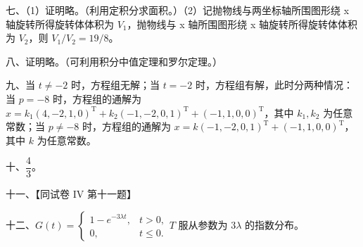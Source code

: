 \documentclass[UTF8,12pt]{ctexart}
\begin{document}
七、（1）证明略。（利用定积分求面积。）（2）记抛物线与两坐标轴所围图形绕 x 轴旋转所得旋转体体积为 \(\displaystyle V_1\)，抛物线与 x 轴所围图形绕 x 轴旋转所得旋转体体积为 \(\displaystyle V_2\)，则 \(\displaystyle V_1/V_2=19/8\)。


八、证明略。（可利用积分中值定理和罗尔定理。）


九、当 \(\displaystyle t\ne-2\) 时，方程组无解；当 \(\displaystyle t=-2\) 时，方程组有解，此时分两种情况：当 \(\displaystyle p=-8\) 时，方程组的通解为 \(\displaystyle x=k_1(4,\allowbreak -2,\allowbreak 1,\allowbreak 0)^{\mathrm T}+k_2(-1,\allowbreak -2,\allowbreak 0,\allowbreak 1)^{\mathrm T}+(-1,\allowbreak 1,\allowbreak 0,\allowbreak 0)^{\mathrm T}\)，其中 \(\displaystyle k_1,\allowbreak k_2\) 为任意常数；当 \(\displaystyle p\ne-8\) 时，方程组的通解为 \(\displaystyle x=k(-1,\allowbreak -2,\allowbreak 0,\allowbreak 1)^{\mathrm T}+(-1,\allowbreak 1,\allowbreak 0,\allowbreak 0)^{\mathrm T}\)，其中 \(\displaystyle k\) 为任意常数。


十、\(\displaystyle \dfrac{\displaystyle 4}{\displaystyle 3}\)。


十一、【同试卷 IV 第十一题】


十二、\(\displaystyle G(t)=\begin{cases}1-e^{-3\lambda t},\allowbreak &t>0,\allowbreak \\0,\allowbreak &t\leq0.\end{cases}\)\(\displaystyle T\) 服从参数为 \(\displaystyle 3\lambda\) 的指数分布。
\end{document}
